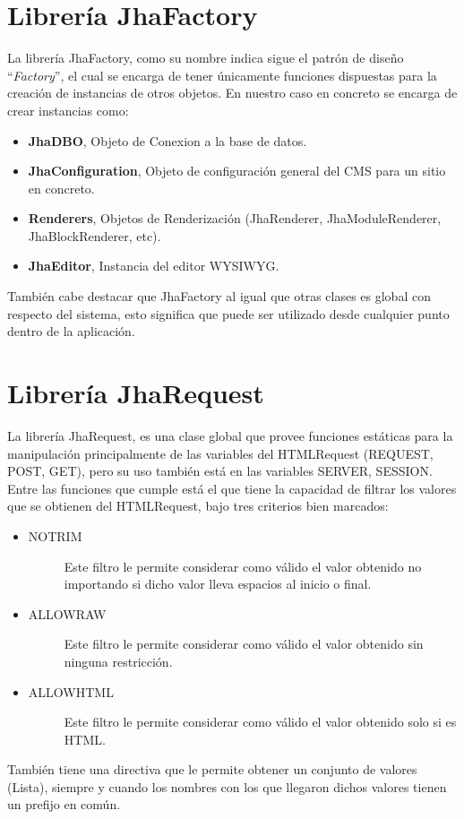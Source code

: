 \section{Librer\'ia JhaFactory}
La librer\'ia JhaFactory, como su nombre indica sigue el patr\'on de dise\~no ``\textit{Factory}'', el cual se encarga de tener \'unicamente funciones dispuestas para la creaci\'on de instancias de otros objetos. En nuestro caso en concreto se encarga de crear instancias como:
\begin{itemize}
\item \textbf{JhaDBO}, Objeto de Conexion a la base de datos.
\item \textbf{JhaConfiguration}, Objeto de configuraci\'on general del CMS para un sitio en concreto.
\item \textbf{Renderers}, Objetos de Renderizaci\'on (\textsf{JhaRenderer}, \textsf{JhaModuleRenderer}, \textsf{JhaBlockRenderer}, etc).
\item \textbf{JhaEditor}, Instancia del editor WYSIWYG.
\end{itemize}
Tambi\'en cabe destacar que JhaFactory al igual que otras clases es global con respecto del sistema, esto significa que puede ser utilizado desde cualquier punto dentro de la aplicaci\'on.

\section{Librer\'ia JhaRequest}
La librer\'ia JhaRequest, es una clase global que provee funciones est\'aticas para la manipulaci\'on principalmente de las variables del HTMLRequest (REQUEST, POST, GET), pero su uso tambi\'en est\'a en las variables SERVER, SESSION.\\
Entre las funciones que cumple est\'a el que tiene la capacidad de filtrar los valores que se obtienen del HTMLRequest, bajo tres criterios bien marcados:
\begin{itemize}
\item \begin{description}
	\item[NOTRIM] Este filtro le permite considerar como v\'alido el valor obtenido no importando si dicho valor lleva espacios al inicio o final.
	\end{description}
\item \begin{description}
	\item[ALLOWRAW] Este filtro le permite considerar como v\'alido el valor obtenido sin ninguna restricci\'on.
	\end{description}
\item \begin{description}
	\item[ALLOWHTML] Este filtro le permite considerar como v\'alido el valor obtenido solo si es HTML.
	\end{description}
\end{itemize}
Tambi\'en tiene una directiva que le permite obtener un conjunto de valores (Lista), siempre y cuando los nombres con los que llegaron dichos valores tienen un prefijo en com\'un.

